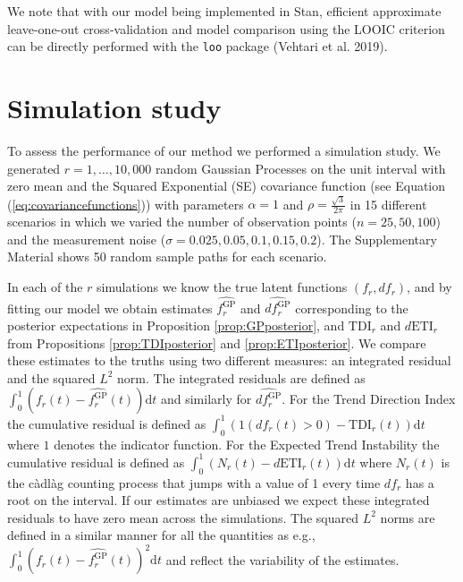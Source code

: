 \documentclass[
  11pt,
]{article}
\theoremstyle{nonumberplain}
\begin{document}
We note that with our model being implemented in Stan, efficient
approximate leave-one-out cross-validation and model comparison using
the LOOIC criterion can be directly performed with the \texttt{loo}
package (Vehtari et al. 2019).

\hypertarget{sec:simulation}{%
\section{Simulation study}\label{sec:simulation}}

To assess the performance of our method we performed a simulation study.
We generated \(r = 1,\ldots, 10,000\) random Gaussian Processes on the
unit interval with zero mean and the Squared Exponential (SE) covariance
function (see Equation (\ref{eq:covariancefunctions})) with parameters
\(\alpha = 1\) and \(\rho = \frac{\sqrt{3}}{{2\pi}}\) in 15 different
scenarios in which we varied the number of observation points
(\(n = 25, 50, 100\)) and the measurement noise
(\(\sigma = 0.025, 0.05, 0.1, 0.15, 0.2\)). The Supplementary Material
shows 50 random sample paths for each scenario.

In each of the \(r\) simulations we know the true latent functions
\((f_r, df_r)\), and by fitting our model we obtain estimates
\(\widehat{f_r^\text{GP}}\) and \(\widehat{df_r^\text{GP}}\)
corresponding to the posterior expectations in Proposition
\ref{prop:GPposterior}, and \(\mathrm{TDI}_r\) and \(d\mathrm{ETI}_r\)
from Propositions \ref{prop:TDIposterior} and \ref{prop:ETIposterior}.
We compare these estimates to the truths using two different measures:
an integrated residual and the squared \(L^2\) norm. The integrated
residuals are defined as
\(\int_0^1 (f_r(t) - \widehat{f_r^\text{GP}}(t))\mathrm{d}t\) and
similarly for \(\widehat{df_r^\text{GP}}\). For the Trend Direction
Index the cumulative residual is defined as
\(\int_0^1 (1(df_r(t) > 0) - \mathrm{TDI}_r(t))\mathrm{d}t\) where \(1\)
denotes the indicator function. For the Expected Trend Instability the
cumulative residual is defined as
\(\int_0^1(N_r(t) - d\mathrm{ETI}_r(t))\mathrm{d}t\) where \(N_r(t)\) is
the càdlàg counting process that jumps with a value of 1 every time
\(df_r\) has a root on the interval. If our estimates are unbiased we
expect these integrated residuals to have zero mean across the
simulations. The squared \(L^2\) norms are defined in a similar manner
for all the quantities as e.g.,
\(\int_0^1 (f_r(t) - \widehat{f_r^\text{GP}}(t))^2\mathrm{d}t\) and
reflect the variability of the estimates.
\end{document}

